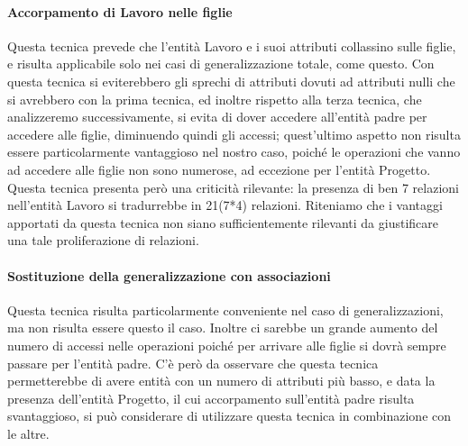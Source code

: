 \documentclass{elegantbook}
\begin{document}
			\paragraph{Accorpamento di Lavoro nelle figlie} 
				Questa tecnica prevede che l'entità Lavoro e i suoi attributi collassino sulle figlie, e risulta applicabile solo nei casi di generalizzazione totale, come questo. Con questa tecnica si eviterebbero gli sprechi di attributi dovuti ad attributi nulli che si avrebbero con la prima tecnica, ed inoltre rispetto alla terza tecnica, che analizzeremo successivamente, si evita di dover accedere all'entità padre per accedere alle figlie, diminuendo quindi gli accessi; quest'ultimo aspetto non risulta essere particolarmente vantaggioso nel nostro caso, poiché le operazioni che vanno ad accedere alle figlie non sono numerose, ad eccezione per l'entità Progetto. Questa tecnica presenta però una criticità rilevante: la presenza di ben 7 relazioni nell'entità Lavoro si tradurrebbe in 21(7*4) relazioni. Riteniamo che i vantaggi apportati da questa tecnica non siano sufficientemente rilevanti da giustificare una tale proliferazione di relazioni.
			
			\paragraph{Sostituzione della generalizzazione con associazioni}
				Questa tecnica risulta particolarmente conveniente nel caso di generalizzazioni, ma non risulta essere questo il caso. Inoltre ci sarebbe un grande aumento del numero di accessi nelle operazioni poiché per arrivare alle figlie si dovrà sempre passare per l'entità padre. C'è però da osservare che questa tecnica permetterebbe di avere entità con un numero di attributi più basso, e data la presenza dell'entità Progetto, il cui accorpamento sull'entità padre risulta svantaggioso, si può considerare di utilizzare questa tecnica in combinazione con le altre.
				
\end{document}
